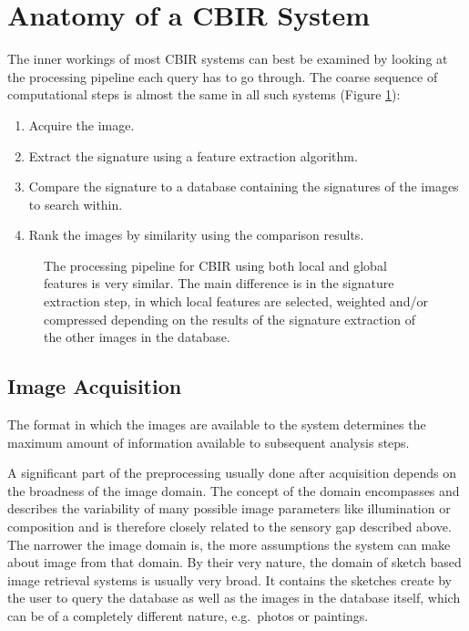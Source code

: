 \section{Anatomy of a CBIR System}\label{sec:anatomy}

The inner workings of most CBIR systems can best be examined by looking at the
processing pipeline each query has to go through. The coarse sequence of
computational steps is almost the same in all such systems (Figure
\ref{fig:cbir_coarse_structure}):

\begin{enumerate}
    \item Acquire the image.
    \item Extract the signature using a feature extraction algorithm.
    \item Compare the signature to a database containing the signatures of the
        images to search within.
    \item Rank the images by similarity using the comparison results.
\end{enumerate}

\begin{figure}[h]
    \centering
    \quad
    \caption[Coarse structure of a CBIR system]{
        The processing pipeline for CBIR using both local and global features
        is very similar. The main difference is in the signature extraction
        step, in which local features are selected, weighted and/or compressed
        depending on the results of the signature extraction of the other
        images in the database.
    }
    \label{fig:cbir_coarse_structure}
\end{figure}

\subsection{Image Acquisition}\label{sec:anatomy_image_acquisition}

The format in which the images are available to the system determines the
maximum amount of information available to subsequent analysis steps.

A significant part of the preprocessing usually done after acquisition depends
on the broadness of the image domain. The concept of the domain encompasses and
describes the variability of many possible image parameters like illumination
or composition and is therefore closely related to the sensory gap described
above. The narrower the image domain is, the more assumptions the system can
make about image from that domain. By their very nature, the domain of sketch
based image retrieval systems is usually very broad. It contains the sketches
create by the user to query the database as well as the images in the database
itself, which can be of a completely different nature, e.g.\ photos or
paintings.

